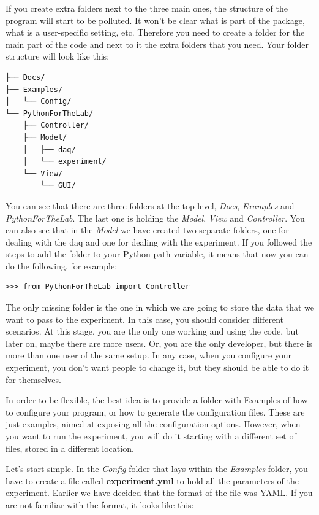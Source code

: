 If you create extra folders next to the three main ones, the structure
of the program will start to be polluted. It won't be clear what is part
of the package, what is a user-specific setting, etc. Therefore you need
to create a folder for the main part of the code and next to it the
extra folders that you need. Your folder structure will look like this:

\begin{verbatim}
├── Docs/
├── Examples/
│   └── Config/
└── PythonForTheLab/
    ├── Controller/
    ├── Model/
    │   ├── daq/
    │   └── experiment/
    └── View/
        └── GUI/
\end{verbatim}

You can see that there are three folders at the top level, \emph{Docs},
\emph{Examples} and \emph{PythonForTheLab}. The last one is holding the
\emph{Model}, \emph{View} and \emph{Controller}. You can also see that
in the \emph{Model} we have created two separate folders, one for
dealing with the daq and one for dealing with the experiment. If you
followed the steps to add the folder to your Python path variable, it
means that now you can do the following, for example:

\begin{verbatim}
>>> from PythonForTheLab import Controller
\end{verbatim}

The only missing folder is the one in which we are going to store the
data that we want to pass to the experiment. In this case, you should
consider different scenarios. At this stage, you are the only one
working and using the code, but later on, maybe there are more users.
Or, you are the only developer, but there is more than one user of the
same setup. In any case, when you configure your experiment, you don't
want people to change it, but they should be able to do it
for themselves.

In order to be flexible, the best idea is to provide a folder with
Examples of how to configure your program, or how to generate the
configuration files. These are just examples, aimed at exposing all the
configuration options. However, when you want to run the experiment, you
will do it starting with a different set of files, stored in a
different location.

Let's start simple. In the \emph{Config} folder that lays within the
\emph{Examples} folder, you have to create a file called
\textbf{experiment.yml} to hold all the parameters of the experiment.
Earlier we have decided that the format of the file was {YAML}. If you
are not familiar with the format, it looks like this:

